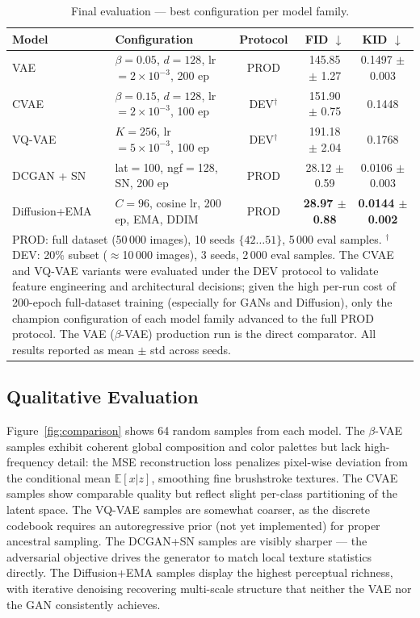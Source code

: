 \documentclass[runningheads]{llncs}
\begin{document}
\begin{table}[htbp]
\caption{Final evaluation — best configuration per model family.}\label{tab:main_results}
\centering
\begin{tabular}{llccc}
\toprule
Model & Configuration & Protocol & FID $\downarrow$ & KID $\downarrow$ \\
\midrule
VAE           & $\beta{=}0.05$, $d{=}128$, lr$=2{\times}10^{-3}$, 200 ep & PROD & 145.85 $\pm$ 1.27 & 0.1497 $\pm$ 0.003 \\
CVAE          & $\beta{=}0.15$, $d{=}128$, lr$=2{\times}10^{-3}$, 100 ep  & DEV$^\dagger$ & 151.90 $\pm$ 0.75 & 0.1448 \\
VQ-VAE        & $K{=}256$, lr$=5{\times}10^{-3}$, 100 ep                  & DEV$^\dagger$ & 191.18 $\pm$ 2.04 & 0.1768 \\
DCGAN + SN    & lat$=$100, ngf$=$128, SN, 200 ep                          & PROD & 28.12 $\pm$ 0.59 & 0.0106 $\pm$ 0.003 \\
Diffusion+EMA & $C{=}96$, cosine lr, 200 ep, EMA, DDIM                    & PROD & \textbf{28.97 $\pm$ 0.88} & \textbf{0.0144 $\pm$ 0.002} \\
\bottomrule
\multicolumn{5}{p{\linewidth}}{\small PROD: full dataset (50\,000 images), 10 seeds $\{42\ldots51\}$, 5\,000 eval samples. $^\dagger$DEV: 20\% subset ($\approx$10\,000 images), 3 seeds, 2\,000 eval samples. The CVAE and VQ-VAE variants were evaluated under the DEV protocol to validate feature engineering and architectural decisions; given the high per-run cost of 200-epoch full-dataset training (especially for GANs and Diffusion), only the champion configuration of each model family advanced to the full PROD protocol. The VAE ($\beta$-VAE) production run is the direct comparator. All results reported as mean $\pm$ std across seeds.} \\
\end{tabular}
\end{table}

\subsection{Qualitative Evaluation}\label{sec:qualitative}

Figure~\ref{fig:comparison} shows 64 random samples from each model. The $\beta$-VAE samples exhibit coherent global composition and color palettes but lack high-frequency detail: the MSE reconstruction loss penalizes pixel-wise deviation from the conditional mean $\mathbb{E}[x|z]$, smoothing fine brushstroke textures. The CVAE samples show comparable quality but reflect slight per-class partitioning of the latent space. The VQ-VAE samples are somewhat coarser, as the discrete codebook requires an autoregressive prior (not yet implemented) for proper ancestral sampling. The DCGAN+SN samples are visibly sharper — the adversarial objective drives the generator to match local texture statistics directly. The Diffusion+EMA samples display the highest perceptual richness, with iterative denoising recovering multi-scale structure that neither the VAE nor the GAN consistently achieves.
\end{document}

